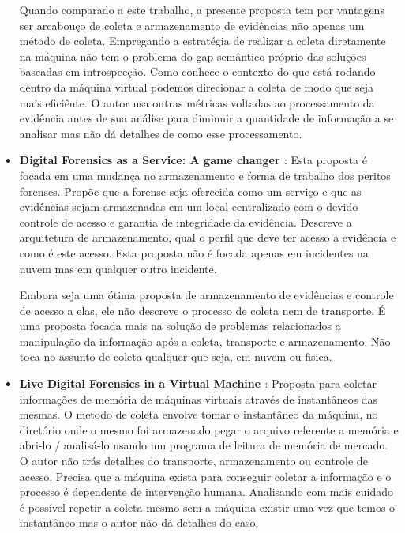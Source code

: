 \documentclass[
	12pt,				%
	openright,			%
	oneside,			%
	a4paper,			%
	english,			%
	french,				%
	spanish,			%
	brazil,				%
	]{abntex2}
\begin{document}
\begin{itemize}
Quando comparado a este trabalho, a presente proposta tem por vantagens ser arcabouço de coleta e armazenamento de evidências não apenas um método de coleta. Empregando a
estratégia de realizar a coleta diretamente na máquina não tem o problema do gap semântico próprio das soluções baseadas em introspecção. Como conhece o contexto do que 
está rodando dentro da máquina virtual podemos direcionar a coleta de modo que seja mais eficiênte. O autor usa outras métricas voltadas ao processamento da evidência antes
de sua análise para diminuir a quantidade de informação a se analisar mas não dá detalhes de como esse processamento.\\

\item \textbf{Digital Forensics as a Service: A game changer \cite{VanBaar2014} }: Esta proposta é focada em uma mudança no armazenamento e forma de trabalho dos peritos forenses.
Propõe que a forense seja oferecida como um serviço e que as evidências sejam armazenadas em um local centralizado com o devido controle de acesso e garantia de integridade da 
evidência. Descreve a arquitetura de armazenamento, qual o perfil que deve ter acesso a evidência e como é este acesso. Esta proposta não é focada apenas em incidentes na nuvem
mas em qualquer outro incidente.

Embora seja uma ótima proposta de armazenamento de evidências e controle de acesso a elas, ele não descreve o processo de coleta nem de transporte. É uma proposta focada 
mais na solução de problemas relacionados a manipulação da informação após a coleta, transporte e armazenamento. Não toca no assunto de coleta qualquer que seja, em nuvem
ou fisica.\\

\item \textbf{Live Digital Forensics in a Virtual Machine \cite{Zhang2010} }: Proposta para coletar informações de memória de máquinas virtuais através de instantâneos das mesmas.
O metodo de coleta envolve tomar o instantâneo da máquina, no diretório onde o mesmo foi armazenado pegar o arquivo referente a memória e abri-lo / analisá-lo usando um programa de
leitura de memória de mercado. O autor não trás detalhes do transporte, armazenamento ou controle de acesso. Precisa que a máquina exista para conseguir coletar a informação e 
o processo é dependente de intervenção humana. Analisando com mais cuidado é possível repetir a coleta mesmo sem a máquina existir uma vez que temos o instantâneo mas o autor não
dá detalhes do caso.


\end{itemize}
\end{document}
